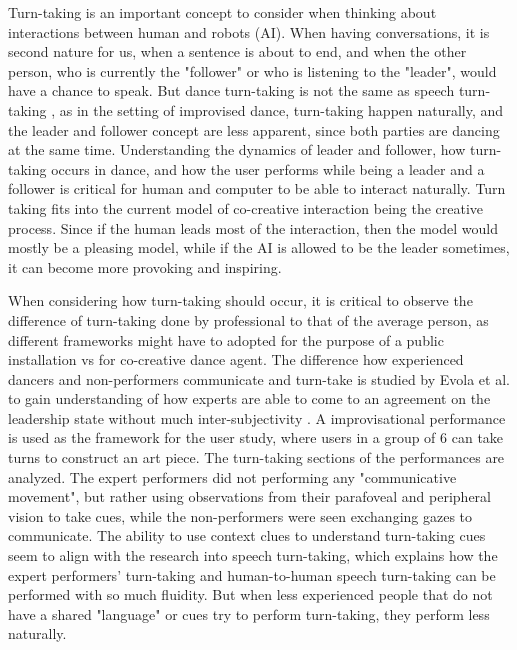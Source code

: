 \documentclass[final,5p,times,twocolumn,authoryear]{article}
\begin{document}
Turn-taking is an important concept to consider when thinking about
interactions between human and robots (AI). When having conversations,
it is second nature for us, when a sentence is about to end, and when
the other person, who is currently the "follower" or who is listening to
the "leader", would have a chance to speak. But dance turn-taking is not
the same as speech turn-taking \cite{Winston2017}, as in the setting of
improvised dance, turn-taking happen naturally, and the leader and
follower concept are less apparent, since both parties are dancing at
the same time. Understanding the dynamics of leader and follower, how
turn-taking occurs in dance, and how the user performs while being a
leader and a follower is critical for human and computer to be able to
interact naturally. Turn taking fits into the current model of
co-creative interaction being the creative process. Since if the human
leads most of the interaction, then the model would mostly be a pleasing
model, while if the AI is allowed to be the leader sometimes, it can
become more provoking and inspiring.

When considering how turn-taking should occur, it is critical to observe
the difference of turn-taking done by professional to that of the
average person, as different frameworks might have to adopted for the
purpose of a public installation vs for co-creative dance agent. 
The difference how experienced dancers and non-performers communicate
and turn-take is studied by Evola et al. to gain understanding of how
experts are able to come to an agreement on the leadership state without
much inter-subjectivity \cite{Evola}. A improvisational performance
is used as the framework for the user study, where users in a group of 6
can take turns to construct an art piece. 
The turn-taking sections of the performances are analyzed.
The expert performers did not performing any "communicative movement", but
rather using observations from their parafoveal and peripheral
vision to take cues, while the non-performers were seen exchanging gazes to
communicate. The ability to use context clues to understand turn-taking
cues seem to align with the research into speech turn-taking, which
explains how the expert performers' turn-taking and human-to-human speech
turn-taking can be performed with so much fluidity. But when less experienced
people that do not have a shared "language" or cues try to perform turn-taking,
they perform less naturally.
\end{document}
